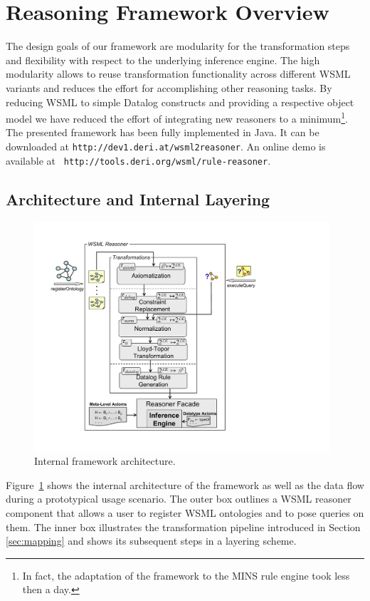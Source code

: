 \section{Reasoning Framework Overview\label{sec:framework}}

The design goals of our framework are modularity for the
transformation steps and flexibility with respect to the
underlying inference engine. The high modularity allows to reuse
transformation functionality across different WSML variants and
reduces the effort for accomplishing other reasoning tasks. By
reducing WSML to simple Datalog constructs and providing a
respective object model we have reduced the effort of integrating
new reasoners to a minimum\footnote{In fact, the adaptation of the
framework to the MINS rule engine took less then a day.}. The
presented framework has been fully implemented in Java. It can be
downloaded at {\tt http://dev1.deri.at/wsml2reasoner}. An online demo is available at {\tt
http://tools.deri.org/wsml/rule-reasoner}.

\subsection{Architecture and Internal Layering}
\begin{figure}[tbp]
    \includegraphics[width=11cm]{figures/layering}
    \centering
    \caption{Internal framework architecture. \label{fig:layering}}
\end{figure}
Figure~\ref{fig:layering} shows the internal architecture of the
framework as well as the data flow during a prototypical usage
scenario. The outer box outlines a WSML reasoner component that
allows a user to register WSML ontologies and to pose queries on
them. The inner box illustrates the transformation pipeline
introduced in Section \ref{sec:mapping} and shows its subsequent
steps in a layering scheme.

